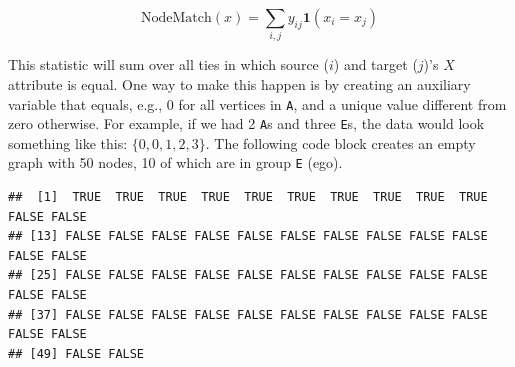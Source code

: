 \documentclass[]{book}
\newenvironment{Shaded}{\begin{snugshade}}{\end{snugshade}}
\newcommand{\CommentTok}[1]{\textcolor[rgb]{0.56,0.35,0.01}{\textit{#1}}}
\newcommand{\DataTypeTok}[1]{\textcolor[rgb]{0.13,0.29,0.53}{#1}}
\newcommand{\DecValTok}[1]{\textcolor[rgb]{0.00,0.00,0.81}{#1}}
\newcommand{\KeywordTok}[1]{\textcolor[rgb]{0.13,0.29,0.53}{\textbf{#1}}}
\newcommand{\NormalTok}[1]{#1}
\newcommand{\OperatorTok}[1]{\textcolor[rgb]{0.81,0.36,0.00}{\textbf{#1}}}
\newcommand{\OtherTok}[1]{\textcolor[rgb]{0.56,0.35,0.01}{#1}}
\newcommand{\StringTok}[1]{\textcolor[rgb]{0.31,0.60,0.02}{#1}}
\begin{document}
\[
\text{NodeMatch}(x) = \sum_{i,j} y_{ij} \mathbf{1}({x_{i} = x_{j}})
\]

This statistic will sum over all ties in which source (\(i\)) and target (\(j\))'s
\(X\) attribute is equal. One way to make this happen is by creating an auxiliary
variable that equals, e.g., 0 for all vertices in \texttt{A}, and a unique value
different from zero otherwise. For example, if we had 2 \texttt{A}s and three \texttt{E}s,
the data would look something like this: \(\{0,0,1,2,3\}\). The following code
block creates an empty graph with 50 nodes, 10 of which are in group \texttt{E} (ego).

\begin{Shaded}
\end{Shaded}

\begin{verbatim}
##  [1]  TRUE  TRUE  TRUE  TRUE  TRUE  TRUE  TRUE  TRUE  TRUE  TRUE FALSE FALSE
## [13] FALSE FALSE FALSE FALSE FALSE FALSE FALSE FALSE FALSE FALSE FALSE FALSE
## [25] FALSE FALSE FALSE FALSE FALSE FALSE FALSE FALSE FALSE FALSE FALSE FALSE
## [37] FALSE FALSE FALSE FALSE FALSE FALSE FALSE FALSE FALSE FALSE FALSE FALSE
## [49] FALSE FALSE
\end{verbatim}

\begin{Shaded}
\end{Shaded}
\end{document}
